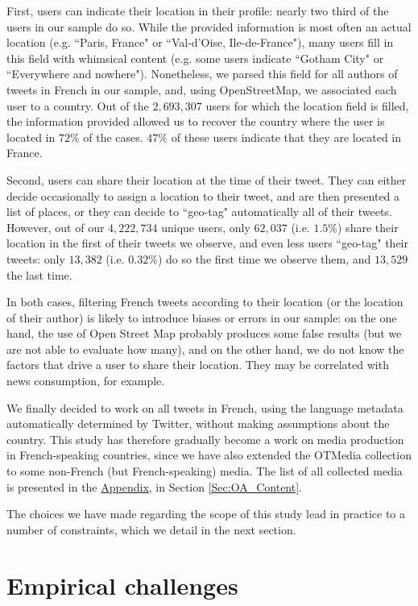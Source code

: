 First, users can indicate their location in their profile: nearly two third of the users in our sample do so. While the provided information is most often an actual location (e.g. ``Paris, France" or ``Val-d'Oise, Ile-de-France"), many users fill in this field with whimsical content (e.g. some users indicate ``Gotham City" or ``Everywhere and nowhere"). Nonetheless, we parsed this field for all authors of tweets in French in our sample, and, using OpenStreetMap, we associated each user to a country. Out of the $2,693,307$ users for which the location field is filled, the information provided allowed us to recover the country where the user is located in $72\%$ of the cases. $47\%$ of these users indicate that they are located in France.

Second, users can share their location at the time of their tweet. They can either decide occasionally to assign a location to their tweet, and are then presented a list of places, or they can decide to ``geo-tag" automatically all of their tweets. However, out of our $4,222,734 $ unique users, only $62,037$ (i.e. $1.5\%$) share their location in the first of their tweets we observe, and even less users ``geo-tag" their tweets: only $ 13,382$ (i.e. $0.32\%$) do so the first time we observe them, and $13,529$ the last time.

In both cases, filtering French tweets according to their location (or the location of their author) is likely to introduce biases or errors in our sample: on the one hand, the use of Open Street Map probably produces some false results (but we are not able to evaluate how many), and on the other hand, we do not know the factors that drive a user to share their location. They may be correlated with news consumption, for example.

We finally decided to work on all tweets in French, using the language metadata automatically determined by Twitter, without making assumptions about the country. This study has therefore gradually become a work on media production in French-speaking countries, since we have also extended the OTMedia collection to some  non-French (but French-speaking) media. The list of all collected media is presented in the \hyperlink{ref:Appendix}{Appendix}, in Section \ref{Sec:OA_Content}.

The choices we have made regarding the scope of this study lead in practice to a number of constraints, which we detail in the next section.

\section{Empirical challenges}

